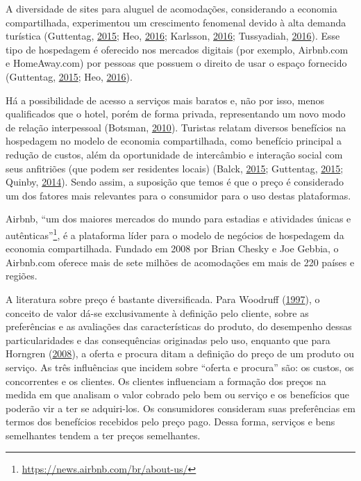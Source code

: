 \documentclass[
	12pt,				%
	a4paper,		%
	oneside,    %
	chapter=TITLE,		   %
	section=TITLE,		   %
	subsection=TITLE,	   %
	subsubsection=TITLE, %
	english,			%
	french,				%
	spanish,			%
	brazil,				%
]{abntex2}
\begin{document}
A diversidade de sites para aluguel de acomodações, considerando a
economia compartilhada, experimentou um crescimento fenomenal devido à
alta demanda turística (Guttentag,
\protect\hyperlink{ref-guttentag2015airbnb}{2015}; Heo,
\protect\hyperlink{ref-heo2016sharing}{2016}; Karlsson,
\protect\hyperlink{ref-karlsson2016someone}{2016}; Tussyadiah,
\protect\hyperlink{ref-tussyadiah2016strategic}{2016}). Esse tipo de
hospedagem é oferecido nos mercados digitais (por exemplo, Airbnb.com e
HomeAway.com) por pessoas que possuem o direito de usar o espaço
fornecido (Guttentag, \protect\hyperlink{ref-guttentag2015airbnb}{2015};
Heo, \protect\hyperlink{ref-heo2016sharing}{2016}).

Há a possibilidade de acesso a serviços mais baratos e, não por isso,
menos qualificados que o hotel, porém de forma privada, representando um
novo modo de relação interpessoal (Botsman,
\protect\hyperlink{ref-botsman2010s}{2010}). Turistas relatam diversos
benefícios na hospedagem no modelo de economia compartilhada, como
benefício principal a redução de custos, além da oportunidade de
intercâmbio e interação social com seus anfitriões (que podem ser
residentes locais) (Balck,
\protect\hyperlink{ref-balck2015empirical}{2015}; Guttentag,
\protect\hyperlink{ref-guttentag2015airbnb}{2015}; Quinby,
\protect\hyperlink{ref-quinby2014share}{2014}). Sendo assim, a suposição
que temos é que o preço é considerado um dos fatores mais relevantes
para o consumidor para o uso destas plataformas.

Airbnb, ``um dos maiores mercados do mundo para estadias e atividades
únicas e
autênticas''\footnote{\url{https://news.airbnb.com/br/about-us/}}, é a
plataforma líder para o modelo de negócios de hospedagem da economia
compartilhada. Fundado em 2008 por Brian Chesky e Joe Gebbia, o
Airbnb.com oferece mais de sete milhões de acomodações em mais de 220
países e regiões.

A literatura sobre preço é bastante diversificada. Para Woodruff
(\protect\hyperlink{ref-woodruff1997customer}{1997}), o conceito de
valor dá-se exclusivamente à definição pelo cliente, sobre as
preferências e as avaliações das características do produto, do
desempenho dessas particularidades e das consequências originadas pelo
uso, enquanto que para Horngren
(\protect\hyperlink{ref-horngren2008contabilidade}{2008}), a oferta e
procura ditam a definição do preço de um produto ou serviço. As três
influências que incidem sobre ``oferta e procura'' são: os custos, os
concorrentes e os clientes. Os clientes influenciam a formação dos
preços na medida em que analisam o valor cobrado pelo bem ou serviço e
os benefícios que poderão vir a ter se adquiri-los. Os consumidores
consideram suas preferências em termos dos benefícios recebidos pelo
preço pago. Dessa forma, serviços e bens semelhantes tendem a ter preços
semelhantes.
\end{document}
